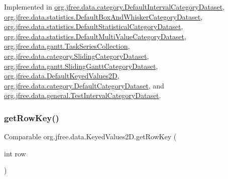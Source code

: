 Implemented in \mbox{\hyperlink{classorg_1_1jfree_1_1data_1_1category_1_1_default_interval_category_dataset_afba38bccf1dff83c9346fec2dad6aa69}{org.\+jfree.\+data.\+category.\+Default\+Interval\+Category\+Dataset}}, \mbox{\hyperlink{classorg_1_1jfree_1_1data_1_1statistics_1_1_default_box_and_whisker_category_dataset_a0d0e397a4efbd71661d91aed88a2fceb}{org.\+jfree.\+data.\+statistics.\+Default\+Box\+And\+Whisker\+Category\+Dataset}}, \mbox{\hyperlink{classorg_1_1jfree_1_1data_1_1statistics_1_1_default_statistical_category_dataset_ad9d326f8427acc2ccda08946308fa12f}{org.\+jfree.\+data.\+statistics.\+Default\+Statistical\+Category\+Dataset}}, \mbox{\hyperlink{classorg_1_1jfree_1_1data_1_1statistics_1_1_default_multi_value_category_dataset_a019bd8dc0f4782a42bd52e161f3913ba}{org.\+jfree.\+data.\+statistics.\+Default\+Multi\+Value\+Category\+Dataset}}, \mbox{\hyperlink{classorg_1_1jfree_1_1data_1_1gantt_1_1_task_series_collection_a4398f6c557565408f40cda1e11e16a08}{org.\+jfree.\+data.\+gantt.\+Task\+Series\+Collection}}, \mbox{\hyperlink{classorg_1_1jfree_1_1data_1_1category_1_1_sliding_category_dataset_ad364c75ca5d7a8bae6f3eaa2e0807310}{org.\+jfree.\+data.\+category.\+Sliding\+Category\+Dataset}}, \mbox{\hyperlink{classorg_1_1jfree_1_1data_1_1gantt_1_1_sliding_gantt_category_dataset_add3562d698dc54aa8a80555690172816}{org.\+jfree.\+data.\+gantt.\+Sliding\+Gantt\+Category\+Dataset}}, \mbox{\hyperlink{classorg_1_1jfree_1_1data_1_1_default_keyed_values2_d_aaca2e39352630d0f49c45a09b8a106e6}{org.\+jfree.\+data.\+Default\+Keyed\+Values2D}}, \mbox{\hyperlink{classorg_1_1jfree_1_1data_1_1category_1_1_default_category_dataset_a2ba50eec333627d8a187c2f252b8600a}{org.\+jfree.\+data.\+category.\+Default\+Category\+Dataset}}, and \mbox{\hyperlink{classorg_1_1jfree_1_1data_1_1general_1_1_test_interval_category_dataset_ad4e109937c0ebf76ebd15b607f1d30de}{org.\+jfree.\+data.\+general.\+Test\+Interval\+Category\+Dataset}}.

\mbox{\label{interfaceorg_1_1jfree_1_1data_1_1_keyed_values2_d_a7c145e2383036a479460e4bca7b40a95}} 
\subsubsection{\texorpdfstring{get\+Row\+Key()}{getRowKey()}}
{\footnotesize\ttfamily Comparable org.\+jfree.\+data.\+Keyed\+Values2\+D.\+get\+Row\+Key (\begin{DoxyParamCaption}\item[{int}]{row }\end{DoxyParamCaption})}

